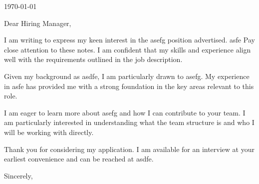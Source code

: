 \documentclass[letterpaper,11pt]{article}
\begin{document}
\today

Dear Hiring Manager,

I am writing to express my keen interest in the asefg position advertised. asfe Pay close attention to these notes. I am confident that my skills and experience align well with the requirements outlined in the job description.

Given my background as asdfe, I am particularly drawn to asefg. My experience in asfe has provided me with a strong foundation in the key areas relevant to this role.

I am eager to learn more about asefg and how I can contribute to your team. I am particularly interested in understanding what the team structure is and who I will be working with directly.

Thank you for considering my application. I am available for an interview at your earliest convenience and can be reached at asdfe.

Sincerely,
\end{document}
